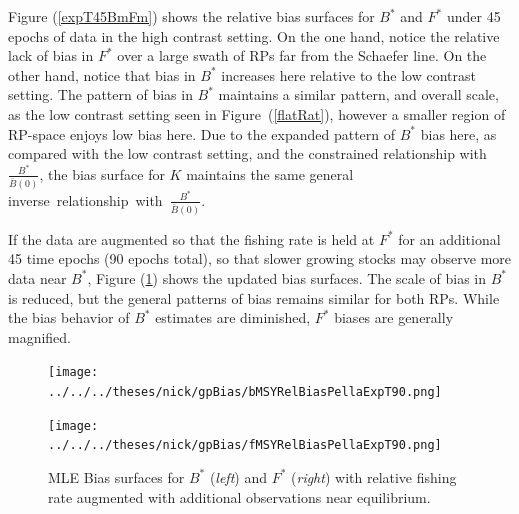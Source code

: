 \documentclass[12pt]{article}
\begin{document}
{%
Figure (\ref{expT45BmFm}) shows the relative bias surfaces for $B^*$ and $F^*$ 
under 45 epochs of data in the high contrast setting. On the one hand, notice 
the relative lack of bias in $F^*$ over a large swath of RPs far from the 
Schaefer line. On the other hand, notice that bias in $B^*$ increases here 
relative to the low contrast setting. The pattern of bias in $B^*$ %
maintains a similar pattern, and overall scale, as the low contrast setting 
seen in \mbox{Figure (\ref{flatRat}),} however a smaller region of RP-space enjoys low 
bias here. Due to the expanded pattern of $B^*$ bias here, as compared with 
the low contrast setting, and the constrained relationship with $\frac{B^*}{\bar B(0)}$, 
the bias surface for $K$ maintains the same general \mbox{inverse relationship 
with $\frac{B^*}{\bar B(0)}$.}

%
If the data are augmented so that the fishing rate is held at $F^*$ for an 
additional 45 time epochs (90 epochs total), so that slower growing stocks may observe more data 
near $B^*$, Figure (\ref{expT90BmFm}) shows the updated bias surfaces. The scale
of bias in $B^*$ is reduced, but the general patterns of bias remains 
similar for both RPs. While the bias behavior of $B^*$ estimates are diminished, 
$F^*$ biases are generally magnified.  

%

%
\begin{figure}[h!]
\begin{minipage}[h!]{0.49\textwidth}
%
\texttt{[image: ../../../theses/nick/gpBias/bMSYRelBiasPellaExpT90.png]}
\end{minipage}
\begin{minipage}[h!]{0.49\textwidth}
\texttt{[image: ../../../theses/nick/gpBias/fMSYRelBiasPellaExpT90.png]}
\end{minipage}
\caption{\label{expT90BmFm}
MLE Bias surfaces for $B^*$ (\emph{left}) and $F^*$ (\emph{right}) with relative fishing rate augmented with additional observations near equilibrium.
}
\end{figure}

%

}
\end{document}
